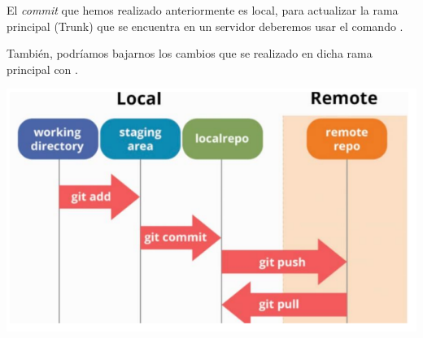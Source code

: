 \begin{minipage}{0.5\textwidth}
	El \textit{commit} que hemos realizado anteriormente es local, para actualizar la rama principal (Trunk) que se encuentra en un servidor deberemos usar el comando .
	
	También, podríamos bajarnos los cambios que se realizado en dicha rama principal con .
\end{minipage}\qquad\begin{minipage}{0.45\textwidth}
	\includegraphics[width=\linewidth]{"Temas/Tema 1/screenshot006"}
\end{minipage}
